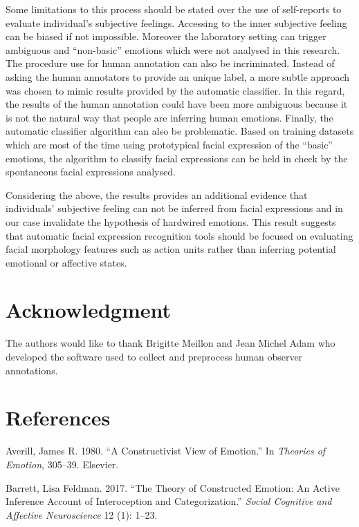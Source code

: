 \documentclass[conference,final,]{IEEEtran}
\begin{document}
Some limitations to this process should be stated over the use of
self-reports to evaluate individual's subjective feelings. Accessing to
the inner subjective feeling can be biased if not impossible. Moreover
the laboratory setting can trigger ambiguous and ``non-basic'' emotions
which were not analysed in this research. The procedure use for human
annotation can also be incriminated. Instead of asking the human
annotators to provide an unique label, a more subtle approach was chosen
to mimic results provided by the automatic classifier. In this regard,
the results of the human annotation could have been more ambiguous
because it is not the natural way that people are inferring human
emotions. Finally, the automatic classifier algorithm can also be
problematic. Based on training datasets which are most of the time using
prototypical facial expression of the ``basic'' emotions, the algorithm
to classify facial expressions can be held in check by the spontaneous
facial expressions analysed.

Considering the above, the results provides an additional evidence that
individuals' subjective feeling can not be inferred from facial
expressions and in our case invalidate the hypothesis of hardwired
emotions. This result suggests that automatic facial expression
recognition tools should be focused on evaluating facial morphology
features such as action units rather than inferring potential emotional
or affective states.

\hypertarget{acknowledgment}{%
\section{Acknowledgment}\label{acknowledgment}}

The authors would like to thank Brigitte Meillon and Jean Michel Adam
who developed the software used to collect and preprocess human observer
annotations.

\hypertarget{references}{%
\section*{References}\label{references}}

\hypertarget{refs}{}
\leavevmode\hypertarget{ref-averill1980constructivist}{}%
Averill, James R. 1980. ``A Constructivist View of Emotion.'' In
\emph{Theories of Emotion}, 305--39. Elsevier.

\leavevmode\hypertarget{ref-barrett2017theory}{}%
Barrett, Lisa Feldman. 2017. ``The Theory of Constructed Emotion: An
Active Inference Account of Interoception and Categorization.''
\emph{Social Cognitive and Affective Neuroscience} 12 (1): 1--23.
\end{document}
